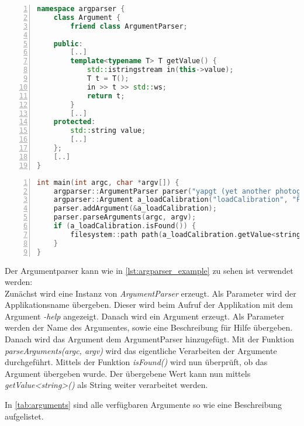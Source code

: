 \begin{lstlisting}[language=c++, numbers=left, breaklines=true, breakatwhitespace=false, label=lst:argparser_argument_friend]
namespace argparser {
    class Argument {
        friend class ArgumentParser;

    public:
        [..]
        template<typename T> T getValue() {
            std::istringstream in(this->value);
            T t = T();
            in >> t >> std::ws;
            return t;
        }
        [..]
    protected:
        std::string value;
        [..]
    };
    [..]
}
\end{lstlisting}

\begin{lstlisting}[language=c++, numbers=left, breaklines=true, breakatwhitespace=false, label=lst:argparser_example, caption=Argparser Verwendung]
int main(int argc, char *argv[]) {
    argparser::ArgumentParser parser("yapgt (yet another photogrammetry tool)");
    argparser::Argument a_loadCalibration("loadCalibration", "Filepath to load calibration from");    
    parser.addArgument(&a_loadCalibration);
    parser.parseArguments(argc, argv);
    if (a_loadCalibration.isFound()) {
        filesystem::path path(a_loadCalibration.getValue<string>());
    }
}
\end{lstlisting}

Der Argumentparser kann wie in \autoref{lst:argparser_example} zu sehen ist verwendet werden:\\
Zunächst wird eine Instanz von \emph{ArgumentParser} erzeugt.
Als Parameter wird der Applikationsname übergeben.
Dieser wird beim Aufruf der Applikation mit dem Argument \emph{-help} angezeigt.
Danach wird ein Argument erzeugt.
Als Parameter werden der Name des Argumentes, sowie eine Beschreibung für Hilfe übergeben.
Danach wird das Argument dem ArgumentParser hinzugefügt.
Mit der Funktion \emph{parseArguments(argc, argv)} wird das eigentliche Verarbeiten der Argumente durchgeführt.
Mittels der Funktion \emph{isFound()} wird nun überprüft, ob das Argument übergeben wurde.
Der übergebene Wert kann nun mittels \emph{getValue<string>()} als String weiter verarbeitet werden.

In \autoref{tab:arguments} sind alle verfügbaren Argumente so wie eine Beschreibung aufgelistet.

